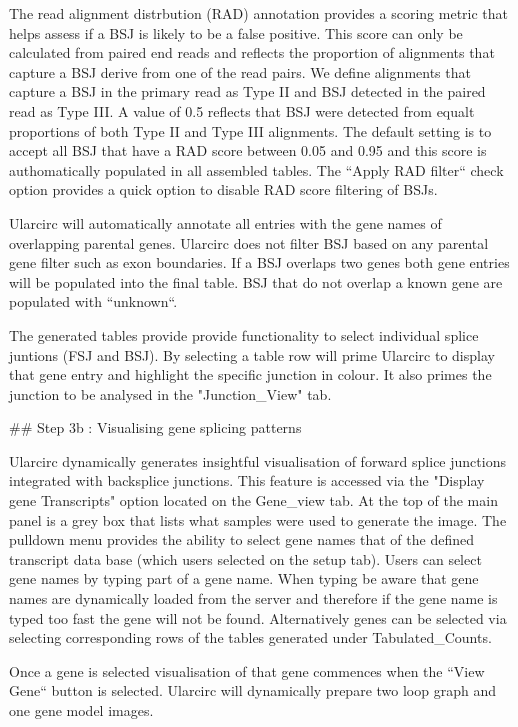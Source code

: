 The read alignment distrbution (RAD) annotation provides a scoring metric that helps assess if a BSJ is likely to be a false positive. This score can only be calculated from paired end reads and reflects the proportion of alignments that capture a BSJ derive from one of the read pairs. We define alignments that capture a BSJ in the primary read as Type II and BSJ detected in the paired read as Type III. A value of 0.5 reflects that BSJ were detected from equalt proportions of both Type II and Type III alignments. The default setting is to accept all BSJ that have a RAD score between 0.05 and 0.95 and this score is authomatically populated in all assembled tables. The ``Apply RAD filter`` check option provides a quick option to disable RAD score filtering of BSJs.  

Ularcirc will automatically annotate all entries with the gene names of overlapping parental genes. Ularcirc does not filter BSJ based on any parental gene filter such as exon boundaries. If a BSJ overlaps two genes both gene entries will be populated into the final table. BSJ that do not overlap a known gene are populated with ``unknown``. 

The generated tables provide provide functionality to select individual splice juntions (FSJ and BSJ). By selecting a table row will prime Ularcirc to display that gene entry and highlight the specific junction in colour. It also primes the junction to be analysed in the "Junction_View" tab.


## Step 3b : Visualising gene splicing patterns

Ularcirc dynamically generates insightful visualisation of forward splice junctions integrated with backsplice junctions. This feature is accessed via the "Display gene Transcripts" option located on the Gene_view tab. At the top of the main panel is a grey box that lists what samples were used to generate the image. The pulldown menu provides the ability to select gene names that of the defined transcript data base (which users selected on the setup tab). Users can select gene names by typing part of a gene name. When typing  be aware that gene names are dynamically loaded from the server and therefore if the gene name is typed too fast the gene will not be found.  Alternatively genes can be selected via selecting corresponding rows of the tables generated under Tabulated_Counts. 

Once a gene is selected visualisation of that gene commences when the ``View Gene`` button is selected. Ularcirc will dynamically prepare two loop graph and one gene model images.


